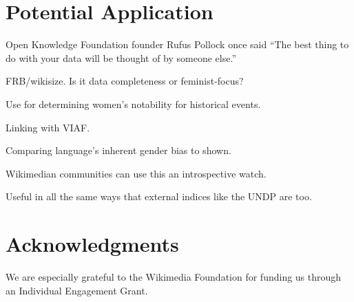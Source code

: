 \documentclass[letterpaper]{article}
\begin{document}
\section{Potential Application}
Open Knowledge Foundation founder Rufus Pollock once said ``The best thing to do with your data will be thought of by someone else.”

FRB/wikisize. Is it data completeness or feminist-focus?


Use for determining women's notability for historical events.

Linking with VIAF. 

Comparing language's inherent gender bias to shown.

Wikimedian communities can use this an introspective watch.

Useful in all the same ways that external indices like the UNDP are too.


\section{ Acknowledgments}
We are especially grateful to the Wikimedia Foundation for funding us through an Individual Engagement Grant.



\end{document}
